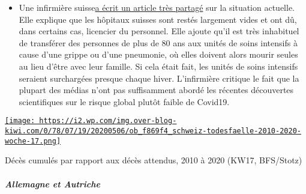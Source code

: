 \begin{itemize}
\tightlist
\item
  Une infirmière
  suisse\href{https://www.facebook.com/simone.christinat/posts/10221314943115981}{a
  écrit un article très partagé} sur la situation actuelle. Elle
  explique que les hôpitaux suisses sont restés largement vides et ont
  dû, dans certains cas, licencier du personnel. Elle ajoute qu'il est
  très inhabituel de transférer des personnes de plus de 80 ans aux
  unités de soins intensifs à cause d'une grippe ou d'une pneumonie, où
  elles doivent alors mourir seules au lieu d'être avec leur famille. Si
  cela était fait, les unités de soins intensifs seraient surchargées
  presque chaque hiver. L'infirmière critique le fait que la plupart des
  médias n'ont pas suffisamment abordé les récentes découvertes
  scientifiques sur le risque global plutôt faible de Covid19.
\end{itemize}

\href{http://img.over-blog-kiwi.com/0/78/07/19/20200506/ob_f869f4_schweiz-todesfaelle-2010-2020-woche-17.png\#width=736\&height=347}{\texttt{[image: https://i2.wp.com/img.over-blog-kiwi.com/0/78/07/19/20200506/ob\_f869f4\_schweiz-todesfaelle-2010-2020-woche-17.png]}}

Décès cumulés par rapport aux décès attendus, 2010 à 2020 (KW17,
BFS/Stotz)

\hypertarget{allemagne-et-autriche-1}{%
\subparagraph{\texorpdfstring{\textbf{Allemagne et
Autriche}}{Allemagne et Autriche}}\label{allemagne-et-autriche-1}}


